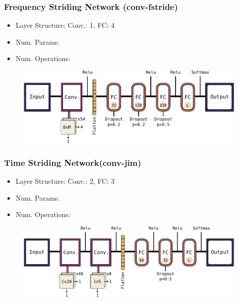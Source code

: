 \begin{frame}
  \frametitle{Frequency Striding Network (conv-fstride)}
  \vspace{-0.5cm}
  \begin{itemize}
    \small
    \item Layer Structure: Conv.: 1, FC: 4
    \item Num. Params:
    \item Num. Operations: 
  \end{itemize}
  \begin{figure} \includegraphics[height=0.35\textheight]{../4_nn/figs/nn_arch_cnn_fstride.pdf} \end{figure}
\end{frame}

\begin{frame}
  \frametitle{Time Striding Network(conv-jim)}
  \vspace{-0.5cm}
  \begin{itemize}
    \small
    \item Layer Structure: Conv.: 2, FC: 3
    \item Num. Params:
    \item Num. Operations: 
  \end{itemize}
  \begin{figure} \includegraphics[height=0.35\textheight]{../4_nn/figs/nn_arch_cnn_jim.pdf} \end{figure}
\end{frame}

